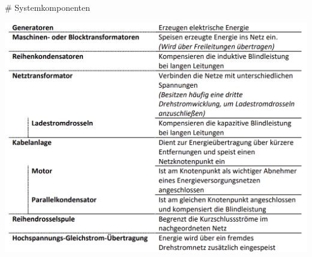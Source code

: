 \begin{markdown}

# Systemkomponenten

\includegraphics[width=\textwidth]{images/03-Systemkomponenten/Systemkomponenten.png}

\end{markdown}